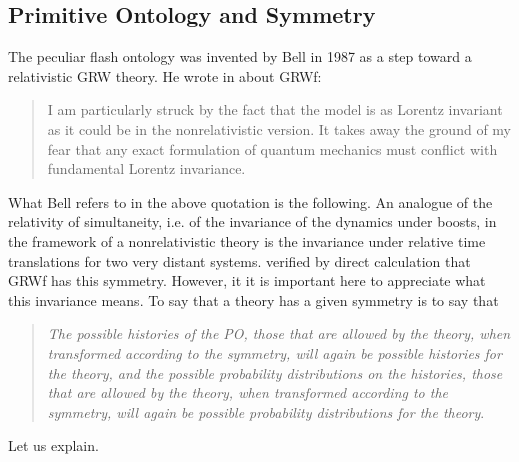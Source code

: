\documentclass[12pt]{article}
\begin{document}
\subsection{Primitive Ontology and Symmetry}
\label{sec:symmetry}
{The} peculiar flash ontology was invented by Bell in 1987 as a step
toward a relativistic {\sf GRW} theory. He wrote in \citep{Bell87} about {\sf GRWf}:
\begin{quote}
I am particularly struck by the fact that the model is as Lorentz
  invariant as it could be in the nonrelativistic version. It takes
  away the ground of my fear that any exact formulation of quantum
  mechanics must conflict with fundamental Lorentz invariance.
\end{quote}
What Bell refers to in the above quotation is the following. 
An analogue of the relativity of simultaneity, i.e. of the invariance of the dynamics under boosts, in the framework of a nonrelativistic theory is the invariance under relative time translations for two very distant systems. \citet{Bell87,Bell89} verified by direct calculation that {\sf GRWf} has this symmetry. However, it
it is important here to appreciate
what this invariance means. 
To say that a theory has a given symmetry is to say that 
\begin{quote}
\emph{The possible histories of the PO, those that are allowed by the theory, when transformed according to the symmetry, will again be possible histories for the theory, and the possible probability distributions on the histories, those that are allowed by the theory,  when transformed according to the symmetry, will again be  possible probability distributions for the theory}.
\end{quote}
Let us explain.
\end{document}

